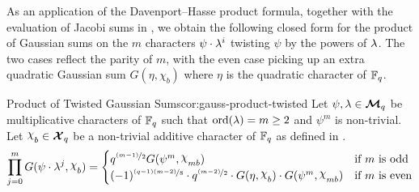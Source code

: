 As an application of the Davenport--Hasse product formula, together with the evaluation of Jacobi sums in , we obtain the following closed form for the product of Gaussian sums on the $m$ characters $\psi\cdot \lambda^i$ twisting $\psi$ by the powers of $\lambda$. The two cases reflect the parity of $m$, with the even case picking up an extra quadratic Gaussian sum $G(\eta,\chi_b)$ where $\eta$ is the quadratic character of $\mathbb{F}_q$.
\begin{corolary}{Product of Twisted Gaussian Sums}{cor:gauss-product-twisted}
  Let $\psi,\lambda\in\boldsymbol{\mathcal{M}}_q$ be multiplicative characters of $\mathbb{F}_q$ such that $\operatorname{ord}(\lambda)=m\geq 2$ and $\psi^m$ is non-trivial. Let $\chi_b\in\Xq$ be a non-trivial additive character of $\mathbb{F}_q$ as defined in .
  $$\prod_{j=0}^m G(\psi\cdot \lm^j,\chi_b) =\begin{cases}
    q^{\nicefrac{(m-1)}{2}}G(\psi^m,\chi_{mb}) & \text{if $m$ is odd}\\ 
    (-1)^{\nicefrac{(q-1)(m-2)}{8}}\cdot q^{\nicefrac{(m-2)}{2}}\cdot G(\eta,\chi_b)\cdot G(\psi^m,\chi_{mb})& \text{if $m$ is even}
  \end{cases}$$
\end{corolary}
